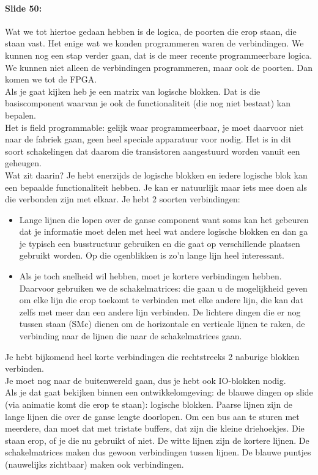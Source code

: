 \documentclass[10pt,a4paper]{book}
\begin{document}
\paragraph{Slide 50:} Wat we tot hiertoe gedaan hebben is de logica, de poorten die erop staan, die staan vast. Het enige wat we konden programmeren waren de verbindingen. We kunnen nog een stap verder gaan, dat is de meer recente programmeerbare logica. We kunnen niet alleen de verbindingen programmeren, maar ook de poorten. Dan komen we tot de FPGA. \\
Als je gaat kijken heb je een matrix van logische blokken. Dat is die basiscomponent waarvan je ook de functionaliteit (die nog niet bestaat) kan bepalen.\\
Het is field programmable: gelijk waar programmeerbaar, je moet daarvoor niet naar de fabriek gaan, geen heel speciale apparatuur voor nodig. Het is in dit soort schakelingen dat daarom die transistoren aangestuurd worden vanuit een geheugen.\\
Wat zit daarin? Je hebt enerzijds de logische blokken en iedere logische blok kan een bepaalde functionaliteit hebben. Je kan er natuurlijk maar iets mee doen als die verbonden zijn met elkaar. Je hebt 2 soorten verbindingen:
\begin{itemize}
\item Lange lijnen die lopen over de ganse component want soms kan het gebeuren dat je informatie moet delen met heel wat andere logische blokken en dan ga je typisch een busstructuur gebruiken en die gaat op verschillende plaatsen gebruikt worden. Op die ogenblikken is zo'n lange lijn heel interessant. 
\item Als je toch snelheid wil hebben, moet je kortere verbindingen hebben. Daarvoor gebruiken we de schakelmatrices: die gaan u de mogelijkheid geven om elke lijn die erop toekomt te verbinden met elke andere lijn, die kan dat zelfs met meer dan een andere lijn verbinden. De lichtere dingen die er nog tussen staan (SMc) dienen om de horizontale en verticale lijnen te raken, de verbinding naar de lijnen die naar de schakelmatrices gaan. 
\end{itemize}
Je hebt bijkomend heel korte verbindingen die rechtstreeks 2 naburige blokken verbinden.\\
Je moet nog naar de buitenwereld gaan, dus je hebt ook IO-blokken nodig.\\
Als je dat gaat bekijken binnen een ontwikkelomgeving: de blauwe dingen op slide (via animatie komt die erop te staan): logische blokken. Paarse lijnen zijn de lange lijnen die over de ganse lengte doorlopen. Om een bus aan te sturen met meerdere, dan moet dat met tristate buffers, dat zijn die kleine driehoekjes. Die staan erop, of je die nu gebruikt of niet. De witte lijnen zijn de kortere lijnen. De schakelmatrices maken dus gewoon verbindingen tussen lijnen. De blauwe puntjes (nauwelijks zichtbaar) maken ook verbindingen.
\end{document}
